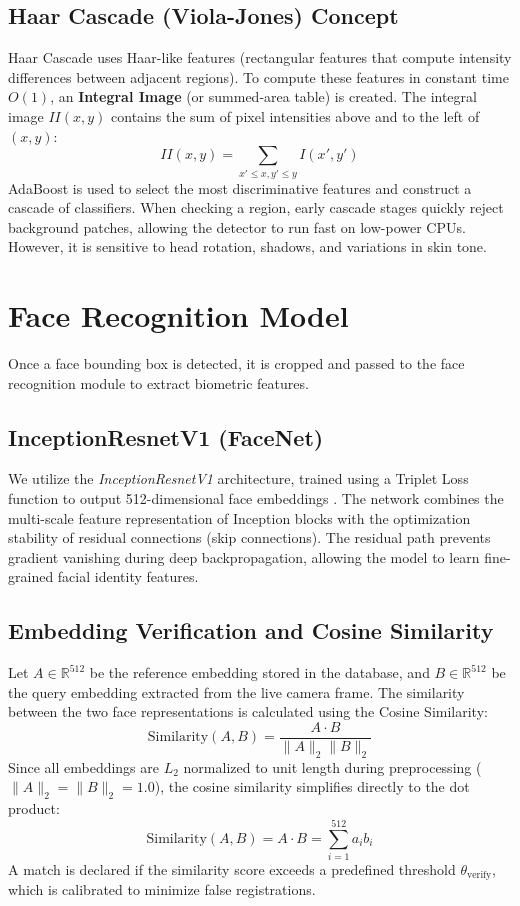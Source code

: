 \subsection{Haar Cascade (Viola-Jones) Concept}
Haar Cascade uses Haar-like features (rectangular features that compute intensity differences between adjacent regions). To compute these features in constant time $O(1)$, an \textbf{Integral Image} (or summed-area table) is created. 
The integral image $II(x, y)$ contains the sum of pixel intensities above and to the left of $(x, y)$:
\begin{equation}
    II(x, y) = \sum_{x' \le x, y' \le y} I(x', y')
\end{equation}
AdaBoost is used to select the most discriminative features and construct a cascade of classifiers. When checking a region, early cascade stages quickly reject background patches, allowing the detector to run fast on low-power CPUs. However, it is sensitive to head rotation, shadows, and variations in skin tone.

\section{Face Recognition Model}
Once a face bounding box is detected, it is cropped and passed to the face recognition module to extract biometric features.

\subsection{InceptionResnetV1 (FaceNet)}
We utilize the \textit{InceptionResnetV1} architecture, trained using a Triplet Loss function to output 512-dimensional face embeddings \cite{schroff2015facenet}. The network combines the multi-scale feature representation of Inception blocks with the optimization stability of residual connections (skip connections). The residual path prevents gradient vanishing during deep backpropagation, allowing the model to learn fine-grained facial identity features.

\subsection{Embedding Verification and Cosine Similarity}
Let $A \in \mathbb{R}^{512}$ be the reference embedding stored in the database, and $B \in \mathbb{R}^{512}$ be the query embedding extracted from the live camera frame. The similarity between the two face representations is calculated using the Cosine Similarity:
\begin{equation}
    \text{Similarity}(A, B) = \frac{A \cdot B}{\|A\|_2 \|B\|_2}
\end{equation}
Since all embeddings are $L_2$ normalized to unit length during preprocessing ($\|A\|_2 = \|B\|_2 = 1.0$), the cosine similarity simplifies directly to the dot product:
\begin{equation}
    \text{Similarity}(A, B) = A \cdot B = \sum_{i=1}^{512} a_i b_i
\end{equation}
A match is declared if the similarity score exceeds a predefined threshold $\theta_{\text{verify}}$, which is calibrated to minimize false registrations.

